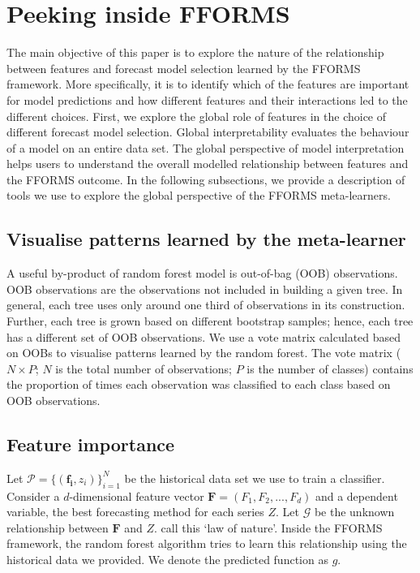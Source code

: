 \documentclass[11pt,a4paper,]{article}
\begin{document}
\hypertarget{peeking}{%
\section{Peeking inside FFORMS}\label{peeking}}

The main objective of this paper is to explore the nature of the relationship between features and forecast model selection learned by the FFORMS framework. More specifically, it is to identify which of the features are important for model predictions and how different features and their interactions led to the different choices. First, we explore the global role of features in the choice of different forecast model selection. Global interpretability evaluates the behaviour of a model on an entire data set. The global perspective of model interpretation helps users to understand the overall modelled relationship between features and the FFORMS outcome. In the following subsections, we provide a description of tools we use to explore the global perspective of the FFORMS meta-learners.

\hypertarget{visualise-patterns-learned-by-the-meta-learner}{%
\subsection{Visualise patterns learned by the meta-learner}\label{visualise-patterns-learned-by-the-meta-learner}}

A useful by-product of random forest model is out-of-bag (OOB) observations. OOB observations are the observations not included in building a given tree. In general, each tree uses only around one third of observations in its construction. Further, each tree is grown based on different bootstrap samples; hence, each tree has a different set of OOB observations. We use a vote matrix calculated based on OOBs to visualise patterns learned by the random forest. The vote matrix (\(N \times P\); \(N\) is the total number of observations; \(P\) is the number of classes) contains the proportion of times each observation was classified to each class based on OOB observations.

\hypertarget{feature-importance}{%
\subsection{Feature importance}\label{feature-importance}}

Let \(\mathcal{P}=\{(\mathbf{f_i}, z_i)\}_{i=1}^{N}\) be the
historical data set we use to train a classifier. Consider a
\(d\)-dimensional feature vector \(\mathbf{F}=(F_1, F_2, ..., F_d)\) and a dependent
variable, the best forecasting method for each series \(Z\). Let \(\mathcal{G}\) be the unknown relationship between \(\mathbf{F}\) and
\(Z\). \textcite{Zhao} call this `law of nature'. Inside the FFORMS framework, the random forest algorithm tries to learn this relationship using
the historical data we provided. We denote the predicted function as
\(g\).
\end{document}
